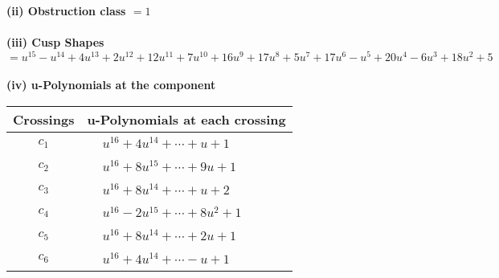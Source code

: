 \documentclass[1p]{elsarticle_modified}
\theoremstyle{definition}
\begin{document}
\flushleft \textbf{(ii) Obstruction class $= 1$}\\~\\
\flushleft \textbf{(iii) Cusp Shapes $= u^{15}- u^{14}+4 u^{13}+2 u^{12}+12 u^{11}+7 u^{10}+16 u^9+17 u^8+5 u^7+17 u^6- u^5+20 u^4-6 u^3+18 u^2+5$}\\~\\
\newpage\renewcommand{\arraystretch}{1}
\flushleft \textbf{(iv) u-Polynomials at the component}\newline \\
\begin{tabular}{m{50pt}|m{274pt}}
Crossings & \hspace{64pt}u-Polynomials at each crossing \\
\hline $$\begin{aligned}c_{1}\end{aligned}$$&$\begin{aligned}
&u^{16}+4 u^{14}+\cdots+u+1
\end{aligned}$\\
\hline $$\begin{aligned}c_{2}\end{aligned}$$&$\begin{aligned}
&u^{16}+8 u^{15}+\cdots+9 u+1
\end{aligned}$\\
\hline $$\begin{aligned}c_{3}\end{aligned}$$&$\begin{aligned}
&u^{16}+8 u^{14}+\cdots+u+2
\end{aligned}$\\
\hline $$\begin{aligned}c_{4}\end{aligned}$$&$\begin{aligned}
&u^{16}-2 u^{15}+\cdots+8 u^2+1
\end{aligned}$\\
\hline $$\begin{aligned}c_{5}\end{aligned}$$&$\begin{aligned}
&u^{16}+8 u^{14}+\cdots+2 u+1
\end{aligned}$\\
\hline $$\begin{aligned}c_{6}\end{aligned}$$&$\begin{aligned}
&u^{16}+4 u^{14}+\cdots- u+1
\end{aligned}$\\

\end{tabular}
\end{document}
